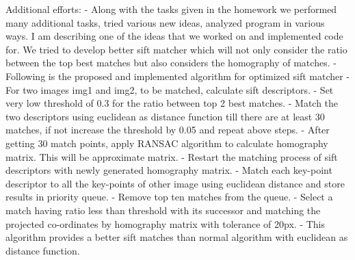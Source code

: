 \documentclass{article}
\begin{document}
\begin{enumerate}
	Additional efforts:\newline
	- Along with the tasks given in the homework we performed many additional tasks, tried various new ideas, analyzed program in various ways. I am describing one of the ideas that we worked on and implemented code for. We tried to develop better sift matcher which will not only consider the ratio between the top best matches but also considers the homography of matches.\newline
	- Following is the proposed and implemented algorithm for optimized sift matcher\newline
	- For two images img1 and img2, to be matched, calculate sift descriptors.\newline
	- Set very low threshold of 0.3 for the ratio between top 2 best matches.\newline
	- Match the two descriptors using euclidean as distance function till there are at least 30 matches, if not increase the threshold by 0.05 and repeat above steps.\newline
	- After getting 30 match points, apply RANSAC algorithm to calculate homography matrix. This will be approximate matrix.\newline
	- Restart the matching process of sift descriptors with newly generated homography matrix. \newline
	- Match each key-point descriptor to all the key-points of other image using euclidean distance and store results in priority queue.\newline
	- Remove top ten matches from the queue.\newline
	- Select a match having ratio less than threshold with its successor and matching the projected co-ordinates by homography matrix with tolerance of 20px.\newline
	- This algorithm provides a better sift matches than normal algorithm with euclidean as distance function.\newline
		\end{enumerate}
		
\end{document}

